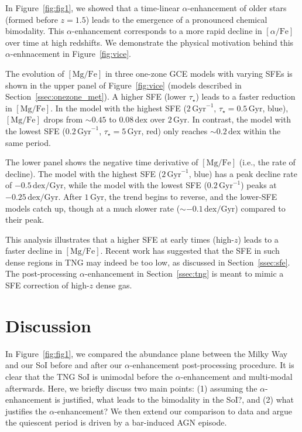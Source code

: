 \documentclass[twocolumn]{aastex631}
\newcommand{\Gyr}{\ensuremath{\textrm{Gyr}}}
\newcommand{\MgFe}{\ensuremath{[\textrm{Mg}/\textrm{Fe}]}}
\newcommand{\alphaFe}{\ensuremath{[\alpha/\textrm{Fe}]}}
\newcommand{\dex}{\ensuremath{\textrm{dex}}}
\begin{document}
In Figure~\ref{fig:fig1}, we showed that a time-linear $\alpha$-enhancement of older stars (formed before $z=1.5$) leads to the emergence of a pronounced chemical bimodality. This $\alpha$-enhancement corresponds to a more rapid decline in \alphaFe{} over time at high redshifts. 
We demonstrate the physical motivation behind this $\alpha$-enhnacement in Figure~\ref{fig:vice}.

The evolution of \MgFe{} in three one-zone GCE models with varying SFEs is shown in the upper panel of Figure~\ref{fig:vice} (models described in Section~\ref{ssec:onezone_met}). A higher SFE (lower $\tau_\star$) leads to a faster reduction in \MgFe{}. In the model with the highest SFE ($2\,\Gyr^{-1}$, $\tau_\star=0.5\,\Gyr$, blue), \MgFe{} drops from $\sim0.45$ to $0.08\,\dex$ over $2\,\Gyr$. In contrast, the model with the lowest SFE ($0.2\,\Gyr^{-1}$, $\tau_\star=5\,\Gyr$, red) only reaches $\sim0.2\,\dex$ within the same period.

The lower panel shows the negative time derivative of \MgFe{} (i.e., the rate of decline). The model with the highest SFE ($2\,\Gyr^{-1}$, blue) has a peak decline rate of $-0.5\,\dex/\Gyr$, while the model with the lowest SFE ($0.2\,\Gyr^{-1}$) peaks at $-0.25\,\dex/\Gyr$. After $1\,\Gyr$, the trend begins to reverse, and the lower-SFE models catch up, though at a much slower rate ($\sim-0.1\,\dex/\Gyr$) compared to their peak.

This analysis illustrates that a higher SFE at early times (high-$z$) leads to a faster decline in \MgFe{}. Recent work has suggested that the SFE in such dense regions in TNG may indeed be too low, as discussed in Section~\ref{ssec:sfe}. The post-processing $\alpha$-enhancement in Section~\ref{ssec:tng} is meant to mimic a SFE correction of high-$z$ dense gas.

\section{Discussion}\label{sec:disc}
In Figure~\ref{fig:fig1}, we compared the abundance plane between the Milky Way and our SoI before and after our $\alpha$-enhancement post-processing procedure. It is clear that the TNG SoI is unimodal before the $\alpha$-enhancement and multi-modal afterwards. Here, we briefly discuss two main points: (1) assuming the $\alpha$-enhancement is justified, what leads to the bimodality in the SoI?, and (2) what justifies the $\alpha$-enhancement? We then extend our comparison to data and argue the quiescent period is driven by a bar-induced AGN episode.
\end{document}
